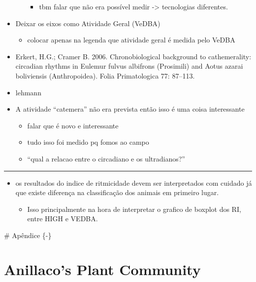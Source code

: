 \documentclass[english,msc,numbers,hidelinks]{coppe}
\providecommand{\tightlist}{%
  \setlength{\itemsep}{0pt}\setlength{\parskip}{0pt}}
\begin{document}
\begin{itemize}
\begin{itemize}
\begin{itemize}
      \item
        tbm falar que não era possível medir -\textgreater{} tecnologias diferentes.
      \end{itemize}
    \end{itemize}
  \item
    Deixar os eixos como Atividade Geral (VeDBA)
    \begin{itemize}
    \tightlist
    \item
      colocar apenas na legenda que atividade geral é medida pelo VeDBA
    \end{itemize}
  \item
    Erkert, H.G.; Cramer B. 2006. Chronobiological background to cathemerality: circadian rhythms in Eulemur fulvus albifrons (Prosimili) and Aotus azarai boliviensis (Anthropoidea). Folia Primatologica 77: 87--113.
  \item
    lehmann
  \item
    A atividade ``catemera'' não era prevista então isso é uma coisa interessante
    \begin{itemize}
    \tightlist
    \item
      falar que é novo e interessante
    \item
      tudo isso foi medido pq fomos ao campo
    \item
      ``qual a relacao entre o circadiano e os ultradianos?''
    \end{itemize}
  \end{itemize}
  \begin{center}\rule{0.5\linewidth}{0.5pt}\end{center}
  \begin{itemize}
  \item
    os resultados do indice de ritmicidade devem ser interpretados com cuidado já que existe diferença na classificação dos animais em primeiro lugar.
    \begin{itemize}
    \tightlist
    \item
      Isso principalmente na hora de interpretar o grafico de boxplot dos RI, entre HIGH e VEDBA.
    \end{itemize}
  \end{itemize}
  \appendix \# Apêndice \{-\}

  \hypertarget{anillacos-plant-community}{%
  \chapter{Anillaco's Plant Community}\label{anillacos-plant-community}}
\end{document}

